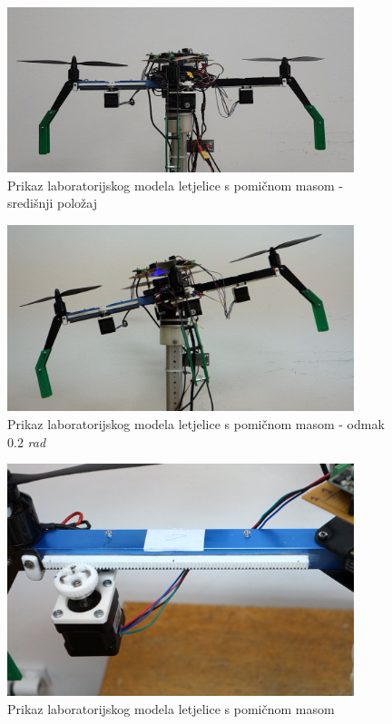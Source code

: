 \documentclass[11pt,a4paper]{article}
\begin{document}
\begin{figure}[H]
	\centering
	\includegraphics[width=0.9\textwidth]{figures/letjelica.png}
	\caption{Prikaz laboratorijskog modela letjelice s pomičnom masom - središnji položaj}
	\label{fig:arm_assembly_Real}
\end{figure}


\begin{figure}[H]
	\centering
	\includegraphics[width=0.9\textwidth]{figures/letjelica2.png}
	\caption{Prikaz laboratorijskog modela letjelice s pomičnom masom - odmak 0.2 \textit{rad}}
	\label{fig:drone_final_2}
\end{figure}
\begin{figure}[H]
	\centering
	\includegraphics[width=0.9\textwidth]{figures/letjelica3.png}
	\caption{Prikaz laboratorijskog modela letjelice s pomičnom masom}
	\label{fig:drone_final_3}
\end{figure}
\end{document}
